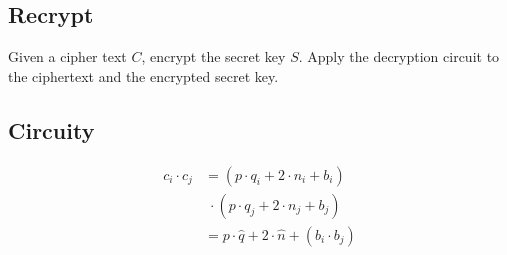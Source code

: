 \documentclass[letterpaper,11pt]{article} %
\begin{document}
\subsection*{Recrypt}
Given a cipher text $C$, encrypt the secret key $S$. Apply the decryption circuit to the ciphertext and the encrypted secret key.
\\

\subsection*{Circuity}
\begin{multicols}{2}

\begin{align*}                                                                                                                                                                                                                              
  c_i\cdot c_j &= \left(p\cdot q_i + 2\cdot n_i + b_i\right)\\&\;\cdot\left(p\cdot q_j + 2\cdot n_j + b_j\right)\\                                                                                                                          
  &= p\cdot\hat{q} + 2\cdot\hat{n} + \left(b_i\cdot b_j\right)                                                                                                                                                                              
\end{align*}



\end{multicols}
\end{document}
